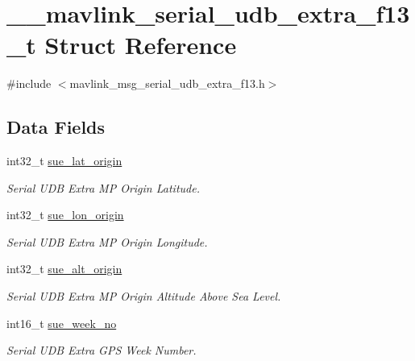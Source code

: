 \hypertarget{struct____mavlink__serial__udb__extra__f13__t}{\section{\+\_\+\+\_\+mavlink\+\_\+serial\+\_\+udb\+\_\+extra\+\_\+f13\+\_\+t Struct Reference}
\label{struct____mavlink__serial__udb__extra__f13__t}
}


{\ttfamily \#include $<$mavlink\+\_\+msg\+\_\+serial\+\_\+udb\+\_\+extra\+\_\+f13.\+h$>$}

\subsection*{Data Fields}
\begin{DoxyCompactItemize}
\item 
int32\+\_\+t \hyperlink{struct____mavlink__serial__udb__extra__f13__t_a85ab0c98b69f7b4c27642dcda1104c84}{sue\+\_\+lat\+\_\+origin}
\begin{DoxyCompactList}\small\item\em Serial U\+D\+B Extra M\+P Origin Latitude. \end{DoxyCompactList}\item 
int32\+\_\+t \hyperlink{struct____mavlink__serial__udb__extra__f13__t_a74132ecc3c4087f1c6b011f5a0a050fc}{sue\+\_\+lon\+\_\+origin}
\begin{DoxyCompactList}\small\item\em Serial U\+D\+B Extra M\+P Origin Longitude. \end{DoxyCompactList}\item 
int32\+\_\+t \hyperlink{struct____mavlink__serial__udb__extra__f13__t_a41a0ffba23e8c01fad6ddba5b8b50bd5}{sue\+\_\+alt\+\_\+origin}
\begin{DoxyCompactList}\small\item\em Serial U\+D\+B Extra M\+P Origin Altitude Above Sea Level. \end{DoxyCompactList}\item 
int16\+\_\+t \hyperlink{struct____mavlink__serial__udb__extra__f13__t_a034ddec76787d3cb2dd00994c723b638}{sue\+\_\+week\+\_\+no}
\begin{DoxyCompactList}\small\item\em Serial U\+D\+B Extra G\+P\+S Week Number. \end{DoxyCompactList}\end{DoxyCompactItemize}



